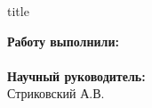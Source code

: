 \begin{frame}[plain]
	
	\begin{center}
		\small{\insertinstitute}
		\vspace{1cm}
	\end{center}
		\begin{beamercolorbox}[sep=8pt,center]{title}
			\inserttitle
		\end{beamercolorbox}
		\vspace{0.1cm}
	\begin{flushright}
		\normalsize \textbf{Работу выполнили:}\\
		\large
		\insertauthor \\
		\vspace{0.5cm}
		\normalsize{\textbf{Научный руководитель:}\\}
		\large{Стриковский А.В.}
		\vfill
	\end{flushright}

\end{frame}
